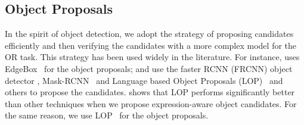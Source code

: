 \documentclass[10pt,twocolumn,letterpaper]{article}
\begin{document}
\subsection{Object Proposals}
\label{sec:objprop} 

In the spirit of object detection, we adopt the strategy of proposing candidates efficiently and then verifying the candidates with a more complex model for the OR task. This strategy has been used widely in the literature. For instance, \cite{hu2016natural} uses EdgeBox~\cite{ZitnickECCV14edgeBoxes} for the object proposals;  
\cite{mao2016generation} and \cite{deep:semantic:alignment:cvpr15} use the faster RCNN (FRCNN) object detector \cite{renNIPS15fasterrcnn}, Mask-RCNN~\cite{he2017mask} and Language based Object Proposals (LOP)~\cite{vasudevan2017chi} and others to propose the candidates. 
\cite{vasudevan2017chi} shows that LOP performs significantly better than other techniques when we propose expression-aware object candidates. For the same reason, we use LOP~\cite{vasudevan2017chi} for the object proposals.
\end{document}
